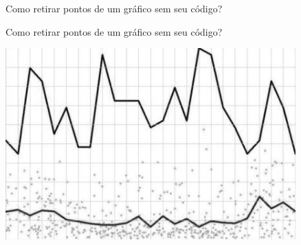 \documentclass[
  ignorenonframetext,
]{beamer}
\newenvironment{Shaded}{\begin{snugshade}}{\end{snugshade}}
\newcommand{\DataTypeTok}[1]{\textcolor[rgb]{0.13,0.29,0.53}{#1}}
\newcommand{\KeywordTok}[1]{\textcolor[rgb]{0.13,0.29,0.53}{\textbf{#1}}}
\newcommand{\NormalTok}[1]{#1}
\newcommand{\OperatorTok}[1]{\textcolor[rgb]{0.81,0.36,0.00}{\textbf{#1}}}
\newcommand{\StringTok}[1]{\textcolor[rgb]{0.31,0.60,0.02}{#1}}
\begin{document}
\begin{frame}[fragile]{Como retirar pontos de um gráfico sem seu
código?}
\protect\hypertarget{como-retirar-pontos-de-um-gruxe1fico-sem-seu-cuxf3digo-1}{}

\begin{Shaded}
\end{Shaded}

\end{frame}

\begin{frame}{Como retirar pontos de um gráfico sem seu código?}
\protect\hypertarget{como-retirar-pontos-de-um-gruxe1fico-sem-seu-cuxf3digo-2}{}

\includegraphics[width=4.4in]{IMAGENS/grafico_ponto1}

\begin{center}
\tiny{}
\end{center}

\end{frame}
\end{document}
